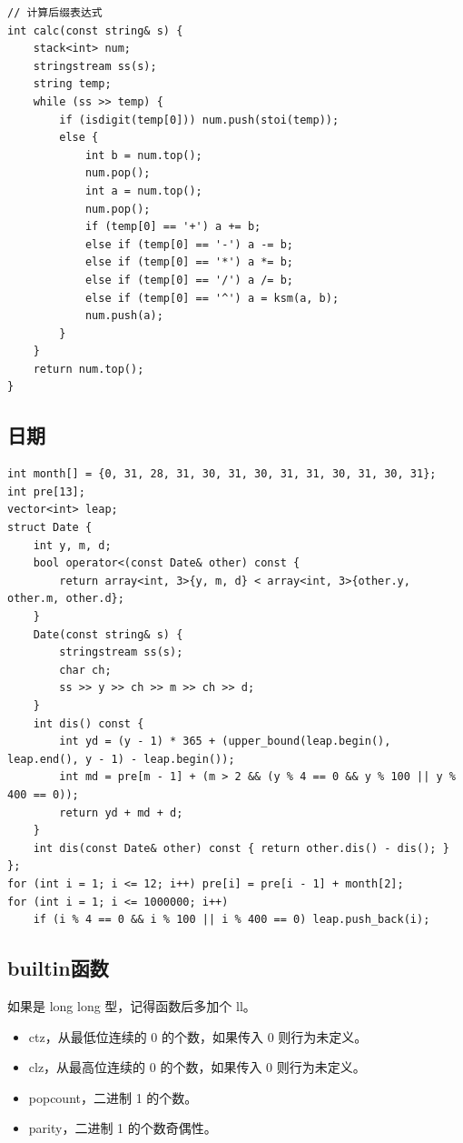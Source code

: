 \documentclass[UTF8, twoside]{ctexart}
\begin{document}
\begin{sloppypar}
\begin{lstlisting}[style=cpp]
// 计算后缀表达式
int calc(const string& s) {
    stack<int> num;
    stringstream ss(s);
    string temp;
    while (ss >> temp) {
        if (isdigit(temp[0])) num.push(stoi(temp));
        else {
            int b = num.top();
            num.pop();
            int a = num.top();
            num.pop();
            if (temp[0] == '+') a += b;
            else if (temp[0] == '-') a -= b;
            else if (temp[0] == '*') a *= b;
            else if (temp[0] == '/') a /= b;
            else if (temp[0] == '^') a = ksm(a, b);
            num.push(a);
        }
    }
    return num.top();
}
\end{lstlisting}

\subsection{日期}

\begin{lstlisting}[style=cpp]
int month[] = {0, 31, 28, 31, 30, 31, 30, 31, 31, 30, 31, 30, 31};
int pre[13];
vector<int> leap;
struct Date {
    int y, m, d;
    bool operator<(const Date& other) const {
        return array<int, 3>{y, m, d} < array<int, 3>{other.y, other.m, other.d};
    }
    Date(const string& s) {
        stringstream ss(s);
        char ch;
        ss >> y >> ch >> m >> ch >> d;
    }
    int dis() const {
        int yd = (y - 1) * 365 + (upper_bound(leap.begin(), leap.end(), y - 1) - leap.begin());
        int md = pre[m - 1] + (m > 2 && (y % 4 == 0 && y % 100 || y % 400 == 0));
        return yd + md + d;
    }
    int dis(const Date& other) const { return other.dis() - dis(); }
};
for (int i = 1; i <= 12; i++) pre[i] = pre[i - 1] + month[2];
for (int i = 1; i <= 1000000; i++)
    if (i % 4 == 0 && i % 100 || i % 400 == 0) leap.push_back(i);
\end{lstlisting}

\subsection{builtin函数}

如果是 long long 型，记得函数后多加个 ll。

\begin{itemize}
   \item ctz，从最低位连续的 0 的个数，如果传入 0 则行为未定义。
   \item clz，从最高位连续的 0 的个数，如果传入 0 则行为未定义。
   \item popcount，二进制 1 的个数。
   \item parity，二进制 1 的个数奇偶性。 
\end{itemize}


\end{sloppypar}
\end{document}
